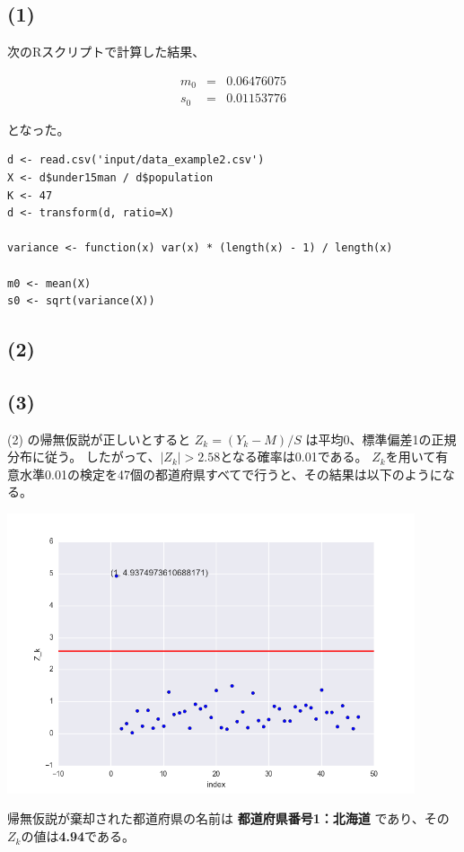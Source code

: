\documentclass[a4j,xelatex,ja=standard,jafont=hiragino-pron, 9pt]{bxjsarticle}
\let\origfigure=\figure
\let\endorigfigure=\endfigure
\renewenvironment{figure}[1][]{%
  \origfigure[H]
}{%
  \endorigfigure
}
\begin{document}
\subsection*{(1)}

次のRスクリプトで計算した結果、

\begin{eqnarray}
    m_0 &=& 0.06476075  \\
    s_0 &=& 0.01153776
\end{eqnarray}

となった。

\begin{lstlisting}
d <- read.csv('input/data_example2.csv')
X <- d$under15man / d$population
K <- 47
d <- transform(d, ratio=X)

variance <- function(x) var(x) * (length(x) - 1) / length(x)

m0 <- mean(X)
s0 <- sqrt(variance(X))
\end{lstlisting}

\subsection*{(2)}

\subsection*{(3)}

(2) の帰無仮説が正しいとすると $Z_k = (Y_k - M) / S$ は平均0、標準偏差1の正規分布に従う。
したがって、$|Z_k| > 2.58$となる確率は0.01である。
$Z_k$を用いて有意水準0.01の検定を47個の都道府県すべてで行うと、その結果は以下のようになる。

\begin{figure}
  \centering
  \includegraphics[width=12cm]{../src/output/image/examine.png}
  \caption{検定の結果}
  \label{}
\end{figure}

帰無仮説が棄却された都道府県の名前は
\textbf{都道府県番号1：北海道}
であり、その$Z_k$の値は\textbf{4.94}である。
\end{document}
